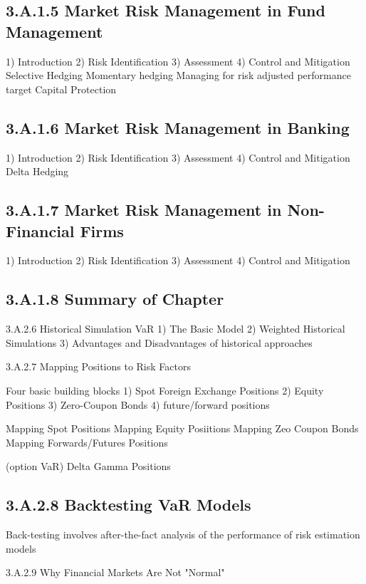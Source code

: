 \documentclass[]{report}
\begin{document}
\subsection{3.A.1.5 Market Risk Management in Fund Management}

1) Introduction
2) Risk Identification
3) Assessment
4) Control and Mitigation
 Selective Hedging
 Momentary hedging
 Managing for risk adjusted performance target
 Capital Protection

\subsection*{3.A.1.6 Market Risk Management in Banking}

1) Introduction
2) Risk Identification
3) Assessment
4) Control and Mitigation
 Delta Hedging


\subsection*{3.A.1.7 Market Risk Management in Non-Financial Firms}

1) Introduction
2) Risk Identification
3) Assessment
4) Control and Mitigation



\subsection{3.A.1.8 Summary of Chapter}


3.A.2.6 Historical Simulation VaR
1) The Basic Model
2) Weighted Historical Simulations
3) Advantages and Disadvantages of historical approaches

3.A.2.7 Mapping Positions to Risk Factors

Four basic building blocks
1) Spot Foreign Exchange Positions
2) Equity Positions
3) Zero-Coupon Bonds
4) future/forward positions

Mapping Spot Positions
Mapping Equity Posiitions
Mapping Zeo Coupon Bonds
Mapping Forwards/Futures Positions

(option VaR) Delta Gamma Positions

\subsection{3.A.2.8 Backtesting VaR Models}

Back-testing involves after-the-fact analysis of the performance of risk estimation models

3.A.2.9 Why Financial Markets Are Not "Normal"
\end{document}
